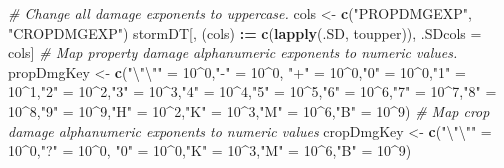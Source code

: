 \documentclass[]{article}
\newenvironment{Shaded}{\begin{snugshade}}{\end{snugshade}}
\newcommand{\KeywordTok}[1]{\textcolor[rgb]{0.13,0.29,0.53}{\textbf{#1}}}
\newcommand{\DecValTok}[1]{\textcolor[rgb]{0.00,0.00,0.81}{#1}}
\newcommand{\CharTok}[1]{\textcolor[rgb]{0.31,0.60,0.02}{#1}}
\newcommand{\StringTok}[1]{\textcolor[rgb]{0.31,0.60,0.02}{#1}}
\newcommand{\CommentTok}[1]{\textcolor[rgb]{0.56,0.35,0.01}{\textit{#1}}}
\newcommand{\OperatorTok}[1]{\textcolor[rgb]{0.81,0.36,0.00}{\textbf{#1}}}
\newcommand{\ErrorTok}[1]{\textcolor[rgb]{0.64,0.00,0.00}{\textbf{#1}}}
\newcommand{\NormalTok}[1]{#1}
\begin{document}
\begin{Shaded}
\begin{Highlighting}[]
\CommentTok{# Change all damage exponents to uppercase.}
\NormalTok{cols <-}\StringTok{ }\KeywordTok{c}\NormalTok{(}\StringTok{"PROPDMGEXP"}\NormalTok{, }\StringTok{"CROPDMGEXP"}\NormalTok{)}
\NormalTok{stormDT[,  (cols) }\OperatorTok{:}\ErrorTok{=}\StringTok{ }\KeywordTok{c}\NormalTok{(}\KeywordTok{lapply}\NormalTok{(.SD, toupper)), .SDcols =}\StringTok{ }\NormalTok{cols]}
\CommentTok{# Map property damage alphanumeric exponents to numeric values.}
\NormalTok{propDmgKey <-}\StringTok{  }\KeywordTok{c}\NormalTok{(}\StringTok{"}\CharTok{\textbackslash{}"\textbackslash{}"}\StringTok{"}\NormalTok{ =}\StringTok{ }\DecValTok{10}\OperatorTok{^}\DecValTok{0}\NormalTok{,}\StringTok{"-"}\NormalTok{ =}\StringTok{ }\DecValTok{10}\OperatorTok{^}\DecValTok{0}\NormalTok{, }\StringTok{"+"}\NormalTok{ =}\StringTok{ }\DecValTok{10}\OperatorTok{^}\DecValTok{0}\NormalTok{,}\StringTok{"0"}\NormalTok{ =}\StringTok{ }\DecValTok{10}\OperatorTok{^}\DecValTok{0}\NormalTok{,}\StringTok{"1"}\NormalTok{ =}\StringTok{ }\DecValTok{10}\OperatorTok{^}\DecValTok{1}\NormalTok{,}\StringTok{"2"}\NormalTok{ =}\StringTok{ }\DecValTok{10}\OperatorTok{^}\DecValTok{2}\NormalTok{,}\StringTok{"3"}\NormalTok{ =}\StringTok{ }\DecValTok{10}\OperatorTok{^}\DecValTok{3}\NormalTok{,}\StringTok{"4"}\NormalTok{ =}\StringTok{ }\DecValTok{10}\OperatorTok{^}\DecValTok{4}\NormalTok{,}\StringTok{"5"}\NormalTok{ =}\StringTok{ }\DecValTok{10}\OperatorTok{^}\DecValTok{5}\NormalTok{,}\StringTok{"6"}\NormalTok{ =}\StringTok{ }\DecValTok{10}\OperatorTok{^}\DecValTok{6}\NormalTok{,}\StringTok{"7"}\NormalTok{ =}\StringTok{ }\DecValTok{10}\OperatorTok{^}\DecValTok{7}\NormalTok{,}\StringTok{"8"}\NormalTok{ =}\StringTok{ }\DecValTok{10}\OperatorTok{^}\DecValTok{8}\NormalTok{,}\StringTok{"9"}\NormalTok{ =}\StringTok{ }\DecValTok{10}\OperatorTok{^}\DecValTok{9}\NormalTok{,}\StringTok{"H"}\NormalTok{ =}\StringTok{ }\DecValTok{10}\OperatorTok{^}\DecValTok{2}\NormalTok{,}\StringTok{"K"}\NormalTok{ =}\StringTok{ }\DecValTok{10}\OperatorTok{^}\DecValTok{3}\NormalTok{,}\StringTok{"M"}\NormalTok{ =}\StringTok{ }\DecValTok{10}\OperatorTok{^}\DecValTok{6}\NormalTok{,}\StringTok{"B"}\NormalTok{ =}\StringTok{ }\DecValTok{10}\OperatorTok{^}\DecValTok{9}\NormalTok{)}
\CommentTok{# Map crop damage alphanumeric exponents to numeric values}
\NormalTok{cropDmgKey <-}\StringTok{  }\KeywordTok{c}\NormalTok{(}\StringTok{"}\CharTok{\textbackslash{}"\textbackslash{}"}\StringTok{"}\NormalTok{ =}\StringTok{ }\DecValTok{10}\OperatorTok{^}\DecValTok{0}\NormalTok{,}\StringTok{"?"}\NormalTok{ =}\StringTok{ }\DecValTok{10}\OperatorTok{^}\DecValTok{0}\NormalTok{, }\StringTok{"0"}\NormalTok{ =}\StringTok{ }\DecValTok{10}\OperatorTok{^}\DecValTok{0}\NormalTok{,}\StringTok{"K"}\NormalTok{ =}\StringTok{ }\DecValTok{10}\OperatorTok{^}\DecValTok{3}\NormalTok{,}\StringTok{"M"}\NormalTok{ =}\StringTok{ }\DecValTok{10}\OperatorTok{^}\DecValTok{6}\NormalTok{,}\StringTok{"B"}\NormalTok{ =}\StringTok{ }\DecValTok{10}\OperatorTok{^}\DecValTok{9}\NormalTok{)}

\end{Highlighting}
\end{Shaded}
\end{document}
